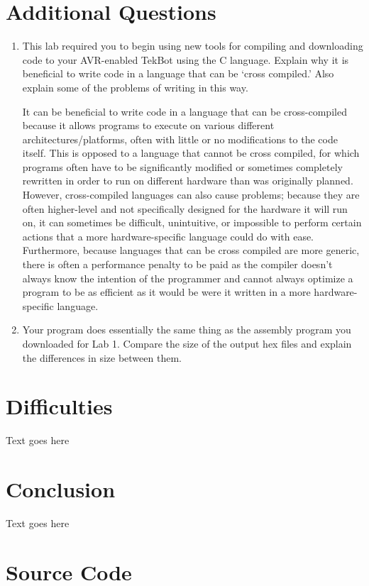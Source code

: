 \documentclass[12pt,letterpaper]{article}
\begin{document}
\section{Additional Questions}
\begin{enumerate}

    \item This lab required you to begin using new tools for compiling and
        downloading code to your AVR-enabled TekBot using the C language.
        Explain why it is beneficial to write code in a language that can be
        ‘cross compiled.’ Also explain some of the problems of writing in this
        way.

        It can be beneficial to write code in a language that can be
        cross-compiled because it allows programs to execute on various
        different architectures/platforms, often with little or no
        modifications to the code itself.  This is opposed to a language that
        cannot be cross compiled, for which programs often have to be
        significantly modified or sometimes completely rewritten in order to
        run on different hardware than was originally planned.  However,
        cross-compiled languages can also cause problems; because they are
        often higher-level and not specifically designed for the hardware it
        will run on, it can sometimes be difficult, unintuitive, or impossible
        to perform certain actions that a more hardware-specific language could
        do with ease.  Furthermore, because languages that can be cross
        compiled are more generic, there is often a performance penalty to be
        paid as the compiler doesn't always know the intention of the
        programmer and cannot always optimize a program to be as efficient as
        it would be were it written in a more hardware-specific language.

    \item Your program does essentially the same thing as the assembly program
        you downloaded for Lab 1. Compare the size of the output hex files and
        explain the differences in size between them.



\end{enumerate}

\section{Difficulties}

Text goes here

\section{Conclusion}

Text goes here

\section{Source Code}


\end{document}
